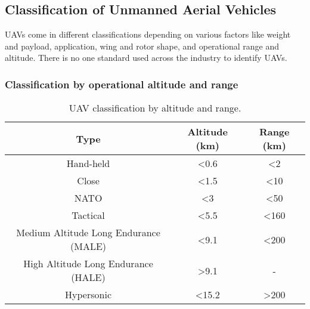 


\subsection{Classification of Unmanned Aerial Vehicles}
\label{subsubsec:classification-of-uavs}

UAVs come in different classifications depending on various factors like weight and payload, application, wing and rotor shape, and operational range and altitude. There is no one standard used across the industry to identify UAVs.


\subsubsection*{Classification by operational altitude and range}

\begin{table}[H]
    \centering
    \begin{tabular}{|c|c|c|}
        \hline
        Type                                  & Altitude (km) & Range (km) \\
        \hline\hline
        Hand-held                             & <0.6          & <2         \\
        \hline
        Close                                 & <1.5          & <10        \\
        \hline
        NATO                                  & <3            & <50        \\
        \hline
        Tactical                              & <5.5          & <160       \\
        \hline
        Medium Altitude Long Endurance (MALE) & <9.1          & <200       \\
        \hline
        High Altitude Long Endurance (HALE)   & >9.1          & -          \\
        \hline
        Hypersonic                            & <15.2         & >200       \\
        \hline
    \end{tabular}
    \caption{UAV classification by altitude and range. \cite{Chamola2021}}
    \label{table:uav-classification-by-alt-range}
\end{table}

